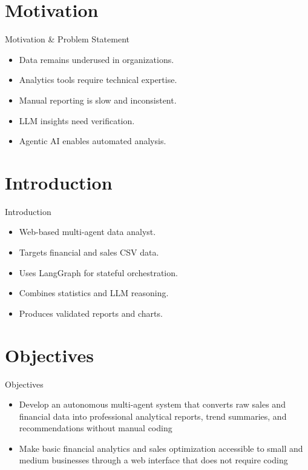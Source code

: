 \documentclass[10pt,aspectratio=43]{beamer}
\begin{document}
\section{Motivation}
\begin{frame}{Motivation \& Problem Statement}
\begin{itemize}
  \item Data remains underused in organizations.
  \item Analytics tools require technical expertise.
  \item Manual reporting is slow and inconsistent.
  \item LLM insights need verification.
  \item Agentic AI enables automated analysis.
\end{itemize}
\end{frame}

\section{Introduction}
\begin{frame}{Introduction}
\begin{itemize}
  \item Web-based multi-agent data analyst.
  \item Targets financial and sales CSV data.
  \item Uses LangGraph for stateful orchestration.
  \item Combines statistics and LLM reasoning.
  \item Produces validated reports and charts.
\end{itemize}
\end{frame}

\section{Objectives}
\begin{frame}{Objectives}
\begin{itemize}
  \item Develop an autonomous multi-agent system that converts raw sales and financial data into professional analytical reports, trend summaries, and recommendations without manual coding
  \item Make basic financial analytics and sales optimization accessible to small and medium businesses through a web interface that does not require coding
\end{itemize}
\end{frame}
\end{document}
